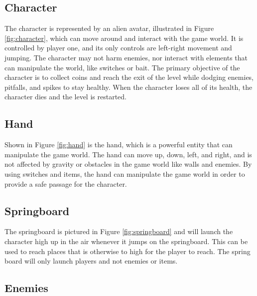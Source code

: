 \subsection{Character}


The character is represented by an alien avatar, illustrated in Figure \ref{fig:character}, which can move around and interact with the game world. It is controlled by player one, and its only controls are left-right movement and jumping. The character may not harm enemies, nor interact with elements that can manipulate the world, like switches or bait. The primary objective of the character is to collect coins and reach the exit of the level while dodging enemies, pitfalls, and spikes to stay healthy. When the character loses all of its health, the character dies and the level is restarted.

\subsection{Hand}


Shown in Figure \ref{fig:hand} is the hand, which is a powerful entity that can manipulate the game world. The hand can move up, down, left, and right, and is not affected by gravity or obstacles in the game world like walls and enemies. By using switches and items, the hand can manipulate the game world in order to provide a safe passage for the character.

\subsection{Springboard}


The springboard is pictured in Figure \ref{fig:springboard} and will launch the character high up in the air whenever it jumps on the springboard. This can be used to reach places that is otherwise to high for the player to reach. The spring board will only launch players and not enemies or items.

\subsection{Enemies}


